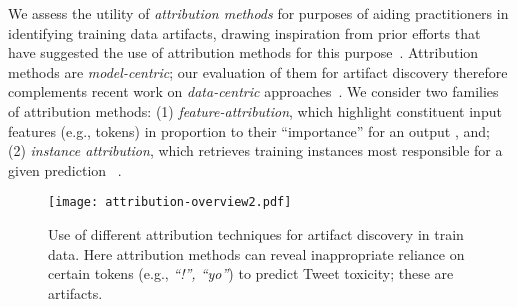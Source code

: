 \documentclass[11pt]{article}
\begin{document}

We assess the utility of \emph{attribution methods} for purposes of aiding practitioners in identifying training data artifacts, drawing inspiration from prior efforts that have suggested the use of attribution methods for this purpose~\cite{han2020explaining, zhou2021feature}.
Attribution methods are \emph{model-centric}; our evaluation of them for artifact discovery therefore complements recent work on \emph{data-centric} approaches~\cite{gardner2021competency}.
We consider two families of attribution methods: (1) \emph{feature-attribution}, which highlight %
constituent input features (e.g., tokens) in proportion to their ``importance'' for an output \citep{ribeiro2016should,lundberg2017unified,adebayo2018sanity}, and; (2) \emph{instance attribution}, which retrieves training instances most responsible for a given prediction ~\cite{koh2017understanding,yeh2018representer, rajani2020explaining,pezeshkpour2021empirical}. %
% 


\begin{figure}[tb]
    \centering
    \texttt{[image: attribution-overview2.pdf]}
    \caption{Use of different attribution techniques for artifact discovery in train data. Here attribution methods can reveal inappropriate reliance on certain tokens (e.g., \emph{``!'', ``yo''}) to predict Tweet toxicity; these are artifacts.}%
    \label{fig:model}
     \minipostspace{}
\end{figure}
\end{document}
